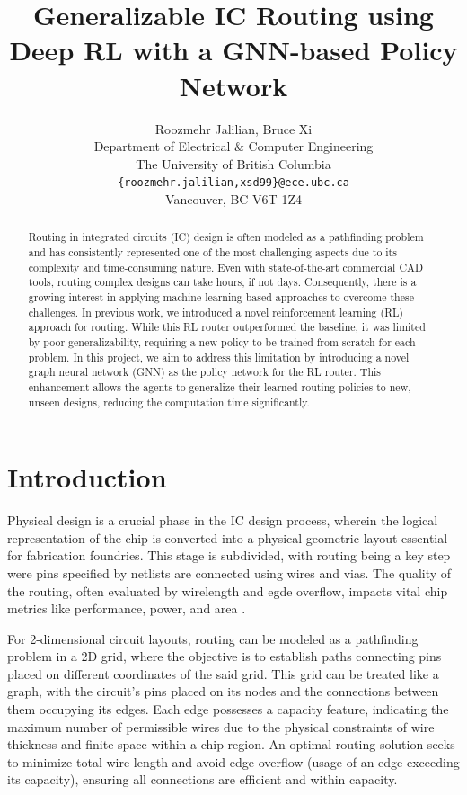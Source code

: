 \documentclass[letterpaper]{article}
\title{Generalizable IC Routing using Deep RL with a GNN-based Policy Network}
\author{%
    Roozmehr Jalilian, Bruce Xi \\
    Department of Electrical \& Computer Engineering \\
    The University of British Columbia \\
    \texttt{\{roozmehr.jalilian,xsd99\}@ece.ubc.ca} \\
    Vancouver, BC V6T 1Z4 }
\begin{document}
\maketitle


\begin{abstract}
Routing in integrated circuits (IC) design is often modeled as a pathfinding
problem and has consistently represented one of the most challenging aspects due
to its complexity and time-consuming nature. Even with state-of-the-art
commercial CAD tools, routing complex designs can take hours, if not days.
Consequently, there is a growing interest in applying machine learning-based
approaches to overcome these challenges. In previous work, we introduced a novel
reinforcement learning (RL) approach for routing. While this RL router
outperformed the baseline, it was limited by poor generalizability, requiring a
new policy to be trained from scratch for each problem. In this project, we aim
to address this limitation by introducing a novel graph neural network (GNN) as
the policy network for the RL router. This enhancement allows the agents to
generalize their learned routing policies to new, unseen designs, reducing the
computation time significantly.
\end{abstract}

\section{Introduction}
Physical design is a crucial phase in the IC design process, wherein the logical
representation of the chip is converted into a physical geometric layout
essential for fabrication foundries. This stage is subdivided, with routing
being a key step were pins specified by netlists are connected using wires and
vias. The quality of the routing, often evaluated by wirelength and egde
overflow, impacts vital chip metrics like performance, power, and area
\cite{Hu2001}.

For 2-dimensional circuit layouts, routing can be modeled as a pathfinding
problem in a 2D grid, where the objective is to establish paths connecting pins
placed on different coordinates of the said grid. This grid can be treated like
a graph, with the circuit's pins placed on its nodes and the connections between
them occupying its edges. Each edge possesses a capacity feature, indicating the
maximum number of permissible wires due to the physical constraints of wire
thickness and finite space within a chip region. An optimal routing solution
seeks to minimize total wire length and avoid edge overflow (usage of an edge
exceeding its capacity), ensuring all connections are efficient and within
capacity.
\end{document}

